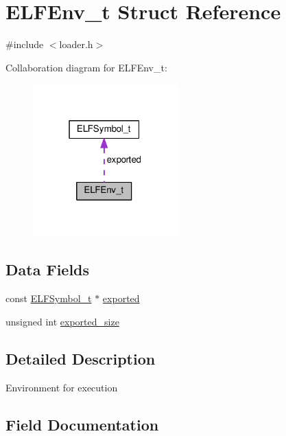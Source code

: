 \hypertarget{structELFEnv__t}{}\section{E\+L\+F\+Env\+\_\+t Struct Reference}
\label{structELFEnv__t}


{\ttfamily \#include $<$loader.\+h$>$}



Collaboration diagram for E\+L\+F\+Env\+\_\+t\+:
\nopagebreak
\begin{figure}[H]
\begin{center}
\leavevmode
\includegraphics[width=159pt]{structELFEnv__t__coll__graph}
\end{center}
\end{figure}
\subsection*{Data Fields}
\begin{DoxyCompactItemize}
\item 
const \hyperlink{structELFSymbol__t}{E\+L\+F\+Symbol\+\_\+t} $\ast$ \hyperlink{structELFEnv__t_a8a0bd1705af8b4e31858d52954ded834}{exported}
\item 
unsigned int \hyperlink{structELFEnv__t_a156be6304952c883292044f482a23d8c}{exported\+\_\+size}
\end{DoxyCompactItemize}


\subsection{Detailed Description}
Environment for execution 

\subsection{Field Documentation}
